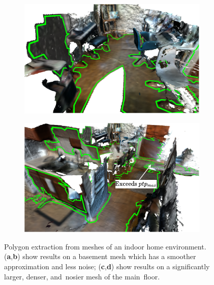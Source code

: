 \begin{figure}[!htb]
\begin{subfigure}[t]{.40\linewidth}
    \centering\includegraphics[clip,trim=0cm 0cm 0cm 0cm, width=.99\linewidth]{chapter_3_polylidar3d/imgs/meshes/mesh_polylidar3d_examples-mesh_mainfloor_two.pdf}
    \caption{\label{fig:ch3_mesh_example_c}}
  \end{subfigure}
  \hfill
  \begin{subfigure}[t]{.40\linewidth}
    \centering\includegraphics[clip,trim=0cm 0cm 0cm 0cm,width=.99\linewidth]{chapter_3_polylidar3d/imgs/meshes/mesh_polylidar3d_examples-mesh_mainfloor_one.pdf}
    \caption{\label{fig:ch3_mesh_example_d}}
  \end{subfigure}
  \caption[Example of Polylidar3D used with user defined meshes]{Polygon extraction from meshes of an indoor home environment. (\textbf{a},\textbf{b}) show results on a basement mesh which has a smoother approximation and less noise; (\textbf{c},\textbf{d}) show results on a significantly larger, denser, and~nosier mesh of the main~floor. }\label{fig:ch3_mesh_example}
\end{figure}
\unskip

